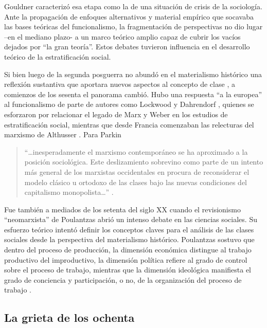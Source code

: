 \documentclass[
]{book}
\begin{document}
Gouldner \citeyearpar{Gouldner2000} caracterizó esa etapa como la de una situación de crisis de la sociología. Ante la propagación de enfoques alternativos y material empírico que socavaba las bases teóricas del funcionalismo, la fragmentación de perspectivas no dio lugar --en el mediano plazo- a un marco teórico amplio capaz de cubrir los vacíos dejados por ``la gran teoría''. Estos debates tuvieron influencia en el desarrollo teórico de la estratificación social.

Si bien luego de la segunda posguerra no abundó en el materialismo histórico una reflexión sustantiva que aportara nuevos aspectos al concepto de clase \citep[p.55]{FeitoAlonso1995}, a comienzos de los sesenta el panorama cambió. Hubo una respuesta ``a la europea'' al funcionalismo de parte de autores como Lockwood \citeyearpar{Lockwood1962} y Dahrendorf \citeyearpar{Dahrendorf1979}, quienes se esforzaron por relacionar el legado de Marx y Weber \citep[pp.~50-51]{FeitoAlonso1995} en los estudios de estratificación social, mientras que desde Francia comenzaban las relecturas del marxismo de Althusser \citeyearpar{Althusser1968}. Para Parkin

\begin{quote}
``\ldots inesperadamente el marxismo contemporáneo se ha aproximado a la posición sociológica. Este deslizamiento sobrevino como parte de un intento más general de los marxistas occidentales en procura de reconsiderar el modelo clásico u ortodoxo de las clases bajo las nuevas condiciones del capitalismo monopolista\ldots{}'' \citeyearpar[pp.~696-697]{Parkin1968}.
\end{quote}

Fue también a mediados de los setenta del siglo XX cuando el revisionismo ``neomarxista'' de Poulantzas \citeyearpar{Poulantzas2005} abrió un intenso debate en las ciencias sociales. Su esfuerzo teórico intentó definir los conceptos claves para el análisis de las clases sociales desde la perspectiva del materialismo histórico. Poulantzas sostuvo que dentro del proceso de producción, la dimensión económica distingue al trabajo productivo del improductivo, la dimensión política refiere al grado de control sobre el proceso de trabajo, mientras que la dimensión ideológica manifiesta el grado de conciencia y participación, o no, de la organización del proceso de trabajo \citep{Parkin1968}.

\hypertarget{la-grieta-de-los-ochenta}{%
\subsection{La grieta de los ochenta}\label{la-grieta-de-los-ochenta}}
\end{document}
